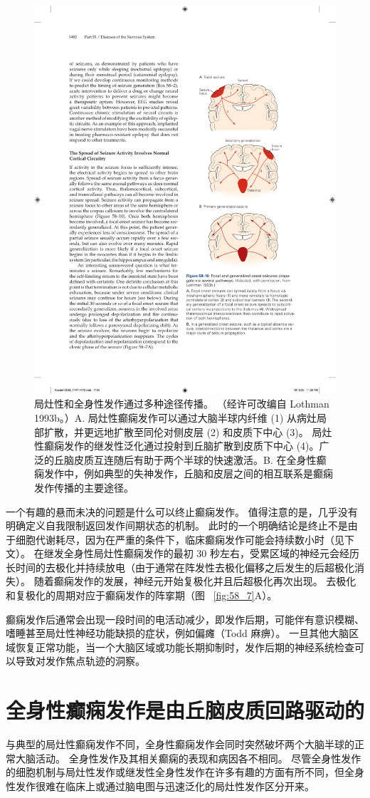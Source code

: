 \begin{figure}[htbp]
	\centering
	\includegraphics[width=0.4\linewidth]{chap58/fig_58_10}
	\caption{局灶性和全身性发作通过多种途径传播。 （经许可改编自 Lothman 1993b。）A. 局灶性癫痫发作可以通过大脑半球内纤维 (1) 从病灶局部扩散，并更远地扩散至同伦对侧皮层 (2) 和皮质下中心 (3)。 局灶性癫痫发作的继发性泛化通过投射到丘脑扩散到皮质下中心 (4)。广泛的丘脑皮质互连随后有助于两个半球的快速激活。B. 在全身性癫痫发作中，例如典型的失神发作，丘脑和皮层之间的相互联系是癫痫发作传播的主要途径。}
	\label{fig:58_10}
\end{figure}


一个有趣的悬而未决的问题是什么可以终止癫痫发作。
值得注意的是，几乎没有明确定义自我限制返回发作间期状态的机制。
此时的一个明确结论是终止不是由于细胞代谢耗尽，因为在严重的条件下，临床癫痫发作可能会持续数小时（见下文）。
在继发全身性局灶性癫痫发作的最初 30 秒左右，受累区域的神经元会经历长时间的去极化并持续放电（由于通常在阵发性去极化偏移之后发生的后超极化消失）。
随着癫痫发作的发展，神经元开始复极化并且后超极化再次出现。
去极化和复极化的周期对应于癫痫发作的阵挛期（图 ~\ref{fig:58_7}A）。


癫痫发作后通常会出现一段时间的电活动减少，即发作后期，可能伴有意识模糊、嗜睡甚至局灶性神经功能缺损的症状，例如偏瘫（Todd 麻痹）。
一旦其他大脑区域恢复正常功能，当一个大脑区域或功能长期抑制时，发作后期的神经系统检查可以导致对发作焦点轨迹的洞察。



\section{全身性癫痫发作是由丘脑皮质回路驱动的}

与典型的局灶性癫痫发作不同，全身性癫痫发作会同时突然破坏两个大脑半球的正常大脑活动。
全身性发作及其相关癫痫的表现和病因各不相同。
尽管全身性发作的细胞机制与局灶性发作或继发性全身性发作在许多有趣的方面有所不同，但全身性发作很难在临床上或通过脑电图与迅速泛化的局灶性发作区分开来。


